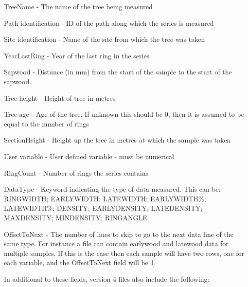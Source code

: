 \begin{itemize*}
 \item TreeName - The name of the tree being measured
 \item Path identification - ID of the path along which the series is measured
 \item Site identification - Name of the site from which the tree was taken
 \item YearLastRing - Year of the last ring in the series
 \item Sapwood - Distance (in mm) from the start of the sample to the start of the sapwood.
 \item Tree height - Height of tree in metres
 \item Tree age - Age of the tree. If unknown this should be 0, then it is assumed to be equal to the number of rings
 \item SectionHeight - Height up the tree in metres at which the sample was taken
 \item User variable - User defined variable - must be numerical
 \item RingCount - Number of rings the series contains
 \item DataType - Keyword indicating the type of data measured. This can be: RINGWIDTH; EARLYWIDTH; LATEWIDTH; EARLYWIDTH\%; LATEWIDTH\%; DENSITY; EARLYDENSITY; LATEDENSITY; MAXDENSITY; MINDENSITY; RINGANGLE.
 \item OffsetToNext - The number of lines to skip to go to the next data line of the same type. For instance a file can contain earlywood and latewood data for multiple samples. If this is the case then each sample will have two rows, one for each variable, and the OffsetToNext field will be 1. 
\end{itemize*}

In additional to these fields, version 4 files also include the following: 

